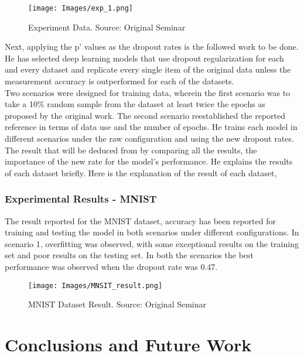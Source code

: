 \documentclass[12pt,letterpaper]{report}
\begin{document}
\begin{figure}[h]
    \centering
    \texttt{[image: Images/exp\_1.png]}
    \caption{Experiment Data. Source: Original Seminar}
    \label{fig:Exp_Data}
\end{figure}

Next, applying the p' values as the dropout rates is the followed work to be done. He has selected deep learning models that use dropout regularization for each and every dataset and replicate every single item of the original data unless the measurement accuracy is outperformed for each of the datasets.\\

Two scenarios were designed for training data, wherein the first scenario was to take a 10\% random sample from the dataset at least twice the epochs as proposed by the original work. The second scenario reestablished the reported reference in terms of data use and the number of epochs. He trains each model in different scenarios under the raw configuration and using the new dropout rates.\\

The result that will be deduced from by comparing all the results, the importance of the new rate for the model's performance. He explains the results of each dataset briefly. Here is the explanation of the result of each dataset, 

\subsection{Experimental Results - MNIST}
The result reported for the MNIST dataset, accuracy has been reported for training and testing the model in both scenarios under different configurations. In scenario 1, overfitting was observed, with some exceptional results on the training set and poor results on the testing set. In both the scenarios the best performance was observed when the dropout rate was 0.47. 

\begin{figure}[h]
    \centering
    \texttt{[image: Images/MNSIT\_result.png]}
    \caption{MNIST Dataset Result. Source: Original Seminar}
    \label{fig:MNSIT_dataset_result}
\end{figure}

\chapter{Conclusions and Future Work}
\end{document}
